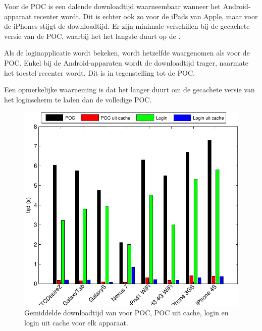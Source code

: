 Voor de POC is een dalende downloadtijd waarneembaar wanneer het Android-apparaat recenter wordt.
Dit is echter ook zo voor de iPads van Apple, maar voor de iPhones stijgt de downloadtijd.
Er zijn minimale verschillen bij de gecachete versie van de POC, waarbij het het langste duurt op de \ipadi{}.

Als de loginapplicatie wordt bekeken, wordt hetzelfde waargenomen als voor de POC.
Enkel bij de Android-apparaten wordt de downloadtijd trager, naarmate het toestel recenter wordt.
Dit is in tegenstelling tot de POC.

Een opmerkelijke waarneming is dat het langer duurt om de gecachete versie van het loginscherm te laden dan de volledige POC.

\begin{figure}[H]
  \centering
  \includegraphics[width=\textwidth]{figuren/performance-jquery.pdf}
  \caption{Gemiddelde downloadtijd van \jqm{} voor POC,  POC uit cache, login en login uit cache voor elk apparaat.}
  \label{fig:performantie-jqm}
\end{figure}

\subsection{\lungo}

